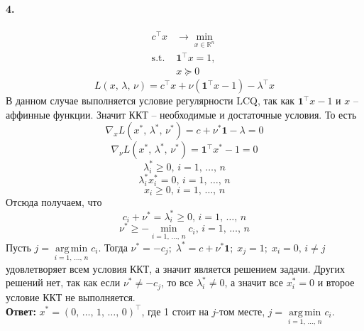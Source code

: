 \documentclass{article}
\DeclareMathOperator*{\argmin}{arg\,min}
\newcommand*{\R}{\mathbb{R}}
\newcommand*{\st}{\text{s.t. }}
\newcommand*{\1}{\mathbf{1}}
\begin{document}
\paragraph{4.}
\[ \begin{split}
    c^\top x &\to \min\limits_{x \in \R^n} \\
    \st & \1^\top x = 1, \\
    & x \succeq 0
\end{split} \]
\[ L(x,\, \lambda,\, \nu) = c^\top x + \nu (\1^\top x - 1) - \lambda^\top x \]
В данном случае выполняется условие регулярности LCQ, так как $\1^\top x - 1$ и $x$ -- аффинные функции. Значит ККТ -- необходимые и достаточные условия. То есть
\[ \nabla_x L(x^\ast,\, \lambda^\ast,\, \nu^\ast) = c + \nu^\ast \1 - \lambda = 0 \]
\[ \nabla_\nu L(x^\ast,\, \lambda^\ast,\, \nu^\ast) = \1^\top x^\ast - 1 = 0 \]
\[ \lambda_i^\ast \geqslant 0,\, i = 1,\, \dotsc,\, n \]
\[ \lambda_i^\ast x_i^\ast = 0,\, i = 1,\, \dotsc,\, n \]
\[ x_i \geqslant 0,\, i = 1,\, \dotsc,\, n \]
Отсюда получаем, что 
\[ c_i + \nu^\ast = \lambda_i^\ast \geqslant 0,\, i = 1,\, \dotsc,\, n \]
\[ \nu^\ast \geqslant -\min\limits_{i = 1,\, \dotsc,\, n} c_i,\, i = 1,\, \dotsc,\, n \]
Пусть $j = \argmin\limits_{i = 1,\, \dotsc,\, n} c_i$. Тогда $\nu^\ast = -c_j;\; \lambda^\ast = c + \nu^\ast \1;\; x_j = 1;\; x_i = 0,\, i \neq j$ удовлетворяет всем условия ККТ, а значит является решением задачи. Других решений нет, так как если $\nu^\ast \neq -c_j$, то все $\lambda^\ast_i \neq 0$, а значит все $x_i^\ast = 0$ и второе условие ККТ не выполняется. \\
\textbf{Ответ: } $x^\ast = (0,\, \dotsc,\, 1,\, \dotsc,\, 0)^\top$, где 1 стоит на $j$-том месте, $j = \argmin\limits_{i = 1,\, \dotsc,\, n} c_i$.
\end{document}
